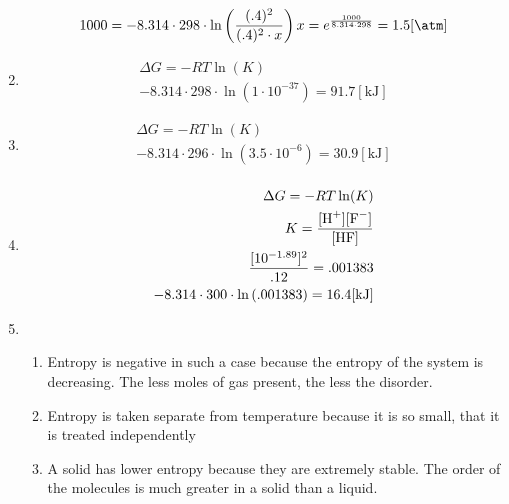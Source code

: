 \documentclass[12pt]{article}
\begin{document}
\begin{enumerate}
    \begin{equation}
      \begin{split}
        1000=-8.314\cdot298\cdot\ln\left( \frac{(.4)^2}{(.4)^2\cdot x} \right)
        x=e^{\frac{1000}{8.314\cdot298}}=1.5[\si{\atm}]
      \end{split}
      \label{4}
    \end{equation}

  \item

    \begin{equation}
      \begin{split}
        \Delta G=-RT\ln(K)\\
        -8.314\cdot298\cdot\ln(1\cdot10^{-37})=91.7[\si{\kilo\joule}]
      \end{split}
      \label{5}
    \end{equation}

  \item

    \begin{equation}
      \begin{split}
        \Delta G =-RT\ln(K)\\
        -8.314\cdot296\cdot\ln(3.5\cdot10^{-6})=30.9[\si{\kilo\joule}]\\
      \end{split}
      \label{6}
    \end{equation}

  \item

    \begin{equation}
      \begin{split}
        \Delta G=-RT\ln(K)\\
        K=\frac{[\ce{H+}][\ce{F-}]}{[\ce{HF}]}\\
        \frac{[10^{-1.89}]^2}{.12}=.001383\\
        -8.314\cdot300\cdot\ln\left(  .001383\right)=16.4[\si{\kilo\joule}]
      \end{split}
      \label{7}
    \end{equation}

  \item

    \begin{enumerate}

      \item Entropy is negative in such a case because the entropy of the system is decreasing. The less moles of gas present, the less the disorder.

      \item Entropy is taken separate from temperature because it is so small, that it is treated independently

      \item A solid has lower entropy because they are extremely stable. The order of the molecules is much greater in a solid than a liquid.

    \end{enumerate}

\end{enumerate}
\end{document}
